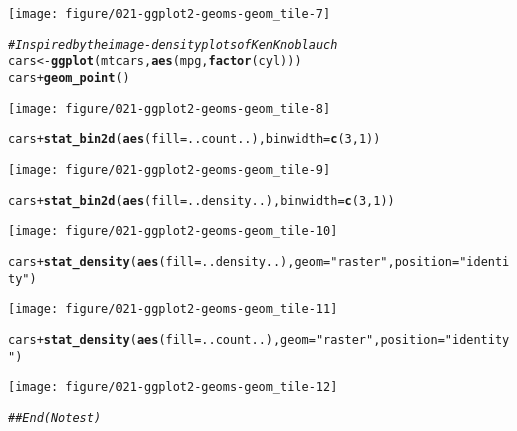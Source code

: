 \documentclass[a4paper,titlepage]{tufte-handout}\usepackage[]{graphicx}\usepackage[]{color}
\makeatletter
\def\maxwidth{ %
  \ifdim\Gin@nat@width>\linewidth
    \linewidth
  \else
    \Gin@nat@width
  \fi
}
\newcommand{\hlnum}[1]{\textcolor[rgb]{0.686,0.059,0.569}{#1}}%
\newcommand{\hlstr}[1]{\textcolor[rgb]{0.192,0.494,0.8}{#1}}%
\newcommand{\hlcom}[1]{\textcolor[rgb]{0.678,0.584,0.686}{\textit{#1}}}%
\newcommand{\hlopt}[1]{\textcolor[rgb]{0,0,0}{#1}}%
\newcommand{\hlstd}[1]{\textcolor[rgb]{0.345,0.345,0.345}{#1}}%
\newcommand{\hlkwb}[1]{\textcolor[rgb]{0.69,0.353,0.396}{#1}}%
\newcommand{\hlkwc}[1]{\textcolor[rgb]{0.333,0.667,0.333}{#1}}%
\newcommand{\hlkwd}[1]{\textcolor[rgb]{0.737,0.353,0.396}{\textbf{#1}}}%
\newenvironment{kframe}{%
 \def\at@end@of@kframe{}%
 \ifinner\ifhmode%
  \def\at@end@of@kframe{\end{minipage}}%
  \begin{minipage}{\columnwidth}%
 \fi\fi%
 \def\FrameCommand##1{\hskip\@totalleftmargin \hskip-\fboxsep
 \colorbox{shadecolor}{##1}\hskip-\fboxsep
     \hskip-\linewidth \hskip-\@totalleftmargin \hskip\columnwidth}%
 \MakeFramed {\advance\hsize-\width
   \@totalleftmargin\z@ \linewidth\hsize
   \@setminipage}}%
 {\par\unskip\endMakeFramed%
 \at@end@of@kframe}
\newenvironment{knitrout}{}{} %
\makeatother
\begin{document}
\begin{knitrout}
\texttt{[image: figure/021-ggplot2-geoms-geom\_tile-7]} 
\begin{kframe}\begin{alltt}
\hlcom{# Inspired by the image-density plots of Ken Knoblauch}
\hlstd{cars} \hlkwb{<-} \hlkwd{ggplot}\hlstd{(mtcars,} \hlkwd{aes}\hlstd{(mpg,} \hlkwd{factor}\hlstd{(cyl)))}
\hlstd{cars} \hlopt{+} \hlkwd{geom_point}\hlstd{()}
\end{alltt}
\end{kframe}
\texttt{[image: figure/021-ggplot2-geoms-geom\_tile-8]} 
\begin{kframe}\begin{alltt}
\hlstd{cars} \hlopt{+} \hlkwd{stat_bin2d}\hlstd{(}\hlkwd{aes}\hlstd{(}\hlkwc{fill} \hlstd{= ..count..),} \hlkwc{binwidth} \hlstd{=} \hlkwd{c}\hlstd{(}\hlnum{3}\hlstd{,}\hlnum{1}\hlstd{))}
\end{alltt}
\end{kframe}
\texttt{[image: figure/021-ggplot2-geoms-geom\_tile-9]} 
\begin{kframe}\begin{alltt}
\hlstd{cars} \hlopt{+} \hlkwd{stat_bin2d}\hlstd{(}\hlkwd{aes}\hlstd{(}\hlkwc{fill} \hlstd{= ..density..),} \hlkwc{binwidth} \hlstd{=} \hlkwd{c}\hlstd{(}\hlnum{3}\hlstd{,}\hlnum{1}\hlstd{))}
\end{alltt}
\end{kframe}
\texttt{[image: figure/021-ggplot2-geoms-geom\_tile-10]} 
\begin{kframe}\begin{alltt}
\hlstd{cars} \hlopt{+} \hlkwd{stat_density}\hlstd{(}\hlkwd{aes}\hlstd{(}\hlkwc{fill} \hlstd{= ..density..),} \hlkwc{geom} \hlstd{=} \hlstr{"raster"}\hlstd{,} \hlkwc{position} \hlstd{=} \hlstr{"identity"}\hlstd{)}
\end{alltt}
\end{kframe}
\texttt{[image: figure/021-ggplot2-geoms-geom\_tile-11]} 
\begin{kframe}\begin{alltt}
\hlstd{cars} \hlopt{+} \hlkwd{stat_density}\hlstd{(}\hlkwd{aes}\hlstd{(}\hlkwc{fill} \hlstd{= ..count..),} \hlkwc{geom} \hlstd{=} \hlstr{"raster"}\hlstd{,} \hlkwc{position} \hlstd{=} \hlstr{"identity"}\hlstd{)}
\end{alltt}
\end{kframe}
\texttt{[image: figure/021-ggplot2-geoms-geom\_tile-12]} 
\begin{kframe}\begin{alltt}
\hlcom{## End(No test)}
\end{alltt}
\end{kframe}
\end{knitrout}
\end{document}
